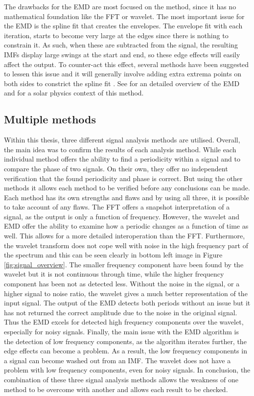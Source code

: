     The drawbacks for the EMD are most focused on the method, since it has no mathematical foundation like the FFT or wavelet.
    The most important issue for the EMD is the spline fit that creates the envelopes.
    The envelope fit with each iteration, starts to become very large at the edges since there is nothing to constrain it.
    As such, when these are subtracted from the signal, the resulting IMFs display large swings at the start and end, so these edge effects will easily affect the output.
    To counter-act this effect, several methods have been suggested to lessen this issue and it will generally involve adding extra extrema points on both sides to constrict the spline fit \citep{zeng2004simple}.
    See \cite{huang} for an detailed overview of the EMD and  \cite{terradas} for a solar physics context of this method.

\subsection{Multiple methods}    

    Within this thesis, three different signal analysis methods are utilised.
    Overall, the main idea was to confirm the results of each analysis method.
    While each individual method offers the ability to find a periodicity within a signal and to compare the phase of two signals. 
    On their own, they offer no independent verification that the found periodicity and phase is correct. 
    But using the other methods it allows each method to be verified before any conclusions can be made.
    Each method has its own strengths and flaws and by using all three, it is possible to take account of any flaws.
    The FFT offers a snapshot interpretation of a signal, as the output is only a function of frequency. 
    However, the wavelet and EMD offer the ability to examine how a periodic changes as a function of time as well.
    This allows for a more detailed interoperation than the FFT.  
    Furthermore, the wavelet transform does not cope well with noise in the high frequency part of the spectrum and this can be seen clearly in bottom left image in Figure \ref{fig:signal_overview}.
    The smaller frequency component have been found by the wavelet but it is not continuous through time, while the higher frequency component has been not as detected less.
    Without the noise in the signal, or a higher signal to noise ratio, the wavelet gives a much better representation of the input signal. 
    The output of the EMD detects both periods without an issue but it has not returned the correct amplitude due to the noise in the original signal. 
    Thus the EMD excels for detected high frequency components over the wavelet, especially for noisy signals.
    Finally, the main issue with the EMD algorithm is the detection of low frequency components, as the algorithm iterates further, the edge effects can become a problem.
    As a result, the low frequency components in a signal can become washed out from an IMF. 
    The wavelet does not have a problem with low frequency components, even for noisy signals. 
    In conclusion, the combination of these three signal analysis methods allows the weakness of one method to be overcome with another and allows each result to be checked.
  
